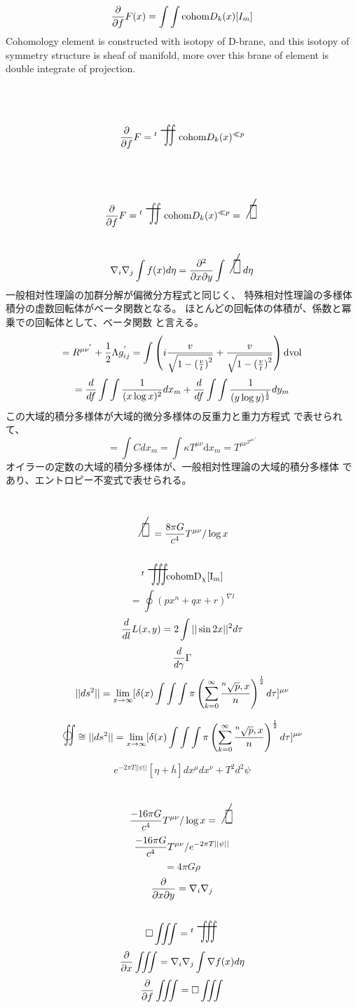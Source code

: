 \documentclass{jsarticle}
\begin{document}
  \newcommand{\oiint}{%
	   \begin{picture}(15,15)
		   \put(0,0){
			   $ \scalebox{1}[2]{$\iint$} $}
		   \put(2,2){$\bigcirc$}
	   \end{picture} %
	   }


 $$ {\partial \over \partial f}F(x) = \int \int \text{cohom}D_k(x)[I_m]  $$
 Cohomology element is constructed with isotopy of D-brane,
 and this isotopy of symmetry structure is sheaf of manifold,
 more over this brane of element is double integrate of projection.
 $$ {\partial \over \partial f}F = {{}^t \scalebox{1}[2]{\variint}}
 \text{cohom}D_k(x)^{\ll p} $$

  $$  {\partial \over \partial f}F = {{}^t \scalebox{1}[2]{\variint}}
 \text{cohom}D_k(x)^{\ll p} = 
\scalebox{1}[2]{\alearletter}$$ 
   $$ \nabla_{i} \nabla_{j} \int f(x) d \eta = {\partial^2 \over {\partial x
   \partial y}}\int \scalebox{1}[2]{\alearletter} d \eta $$
   一般相対性理論の加群分解が偏微分方程式と同じく、
   特殊相対性理論の多様体積分の虚数回転体がベータ関数となる。
   ほとんどの回転体の体積が、係数と冪乗での回転体として、ベータ関数
   と言える。
   $$ = R^{{\mu\nu}^{'}} + {1 \over 2}\Lambda g_{ij}^{'} = \int 
   \left(i {{v \over {
	   \sqrt{1 - 
   {{{({v \over t})}}^{2}}}}}} + {v \over {\sqrt{1 - 
   {{{({v \over t})}}^{2}}}}}\right)\mathrm{dvol} $$
   $$ = {d \over df}\int \int{1 \over {(x \log x)^2}}dx_m +
   {d \over df}\int \int {1 \over {(y \log y)^{1 \over 2}}}dy_m $$ 
    この大域的積分多様体が大域的微分多様体の反重力と重力方程式
    で表せられて、
   $$ = \int C dx_m = \int \kappa T^{\mu\nu} \mathrm dx_m = T^{{\mu\nu}{^{T^
   {\mu\nu}}}^{'}}$$
   オイラーの定数の大域的積分多様体が、一般相対性理論の大域的積分多様体
   であり、エントロピー不変式で表せられる。

  $$ \scalebox{1}[2]{\alearletter} = 
  {{{{8 \pi G} \over {c^4}}T^{\mu\nu}}/ \log x} $$
  $$ {}^{t}\scalebox{1}[2]{\variiint}\mathrm{cohom D_{\chi}[I_m]}$$
  $$ = \oint {(px^n + qx + r)^{\nabla l}} $$
  $$ {d \over d l}L(x,y) = 2 \int ||\sin 2x||^{2}d \tau $$
  $$ {d \over d \gamma}\Gamma $$
 $$ ||ds^2|| = \lim_{x \to \infty} [\delta(x) \int \int \int \pi \left( \sum_{k=0}^{\infty}
		{{}^n\sqrt{p},x \over n} \right)
^{1 \over 2}d \tau]^{\mu\nu} $$

 $$\oiint  \cong  ||ds^2|| = \lim_{x \to \infty} 
 [\delta(x) \int \int \int \pi \left( \sum_{k=0}^{\infty}
		{{}^n\sqrt{p},x \over n} 
		\right)^{1 \over 2}d \tau]^{\mu\nu} $$
 
 $$ e^{-2\pi T||\psi||}[\eta + \bar{h}]dx^{\mu}dx^{\nu} + T^2 d^2 \psi $$
 $$ {{-16 \pi G} \over c^4}T^{\mu\nu}/ \log x =  
 \scalebox{1}[2]{\alearletter} $$
 $${{-16 \pi G} \over c^4}T^{\mu\nu}/ e^{-2\pi T||\psi||} $$
 $$ = 4 \pi G \rho $$
 $$ {\partial \over {\partial x \partial y}} = \nabla_{i} \nabla_{j} $$ 
 $$ \square \iiint  = {}^{t}\scalebox{1}[2]{\variiint}\ $$
 $$ {\partial \over {\partial x}} \iiint = \nabla_{i}\nabla_{j} \int
 \nabla f(x) d \eta $$
 $$ {\partial \over {\partial f}}\iiint = \square \iiint $$
\end{document}

